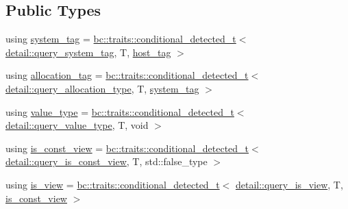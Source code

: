\subsection*{Public Types}
\begin{DoxyCompactItemize}
\item 
using \hyperlink{structbc_1_1tensors_1_1exprs_1_1expression__traits_a13a9bbc7ab291f35143c611ff93f69de}{system\+\_\+tag} = \hyperlink{namespacebc_1_1traits_a1a6d378947ec32acd457890854bcd592}{bc\+::traits\+::conditional\+\_\+detected\+\_\+t}$<$ \hyperlink{namespacebc_1_1tensors_1_1exprs_1_1detail_aa067b2ce78c8e7218f47bded8aec80a8}{detail\+::query\+\_\+system\+\_\+tag}, T, \hyperlink{structbc_1_1host__tag}{host\+\_\+tag} $>$
\item 
using \hyperlink{structbc_1_1tensors_1_1exprs_1_1expression__traits_ac3601870cb49bcd8048d3321b833a733}{allocation\+\_\+tag} = \hyperlink{namespacebc_1_1traits_a1a6d378947ec32acd457890854bcd592}{bc\+::traits\+::conditional\+\_\+detected\+\_\+t}$<$ \hyperlink{namespacebc_1_1tensors_1_1exprs_1_1detail_aa48f3a00816d9b230e5f0ce720323f57}{detail\+::query\+\_\+allocation\+\_\+type}, T, \hyperlink{structbc_1_1tensors_1_1exprs_1_1expression__traits_a13a9bbc7ab291f35143c611ff93f69de}{system\+\_\+tag} $>$
\item 
using \hyperlink{structbc_1_1tensors_1_1exprs_1_1expression__traits_ab4830d8c42c308632e269d6a8de49e83}{value\+\_\+type} = \hyperlink{namespacebc_1_1traits_a1a6d378947ec32acd457890854bcd592}{bc\+::traits\+::conditional\+\_\+detected\+\_\+t}$<$ \hyperlink{namespacebc_1_1tensors_1_1exprs_1_1detail_aa60e0a71bcf8048661b38b904c620fb0}{detail\+::query\+\_\+value\+\_\+type}, T, void $>$
\item 
using \hyperlink{structbc_1_1tensors_1_1exprs_1_1expression__traits_a9542c99877b734bea43fe8e42b3d3c04}{is\+\_\+const\+\_\+view} = \hyperlink{namespacebc_1_1traits_a1a6d378947ec32acd457890854bcd592}{bc\+::traits\+::conditional\+\_\+detected\+\_\+t}$<$ \hyperlink{namespacebc_1_1tensors_1_1exprs_1_1detail_a701fb55d84ce81a94fc5552092b64138}{detail\+::query\+\_\+is\+\_\+const\+\_\+view}, T, std\+::false\+\_\+type $>$
\item 
using \hyperlink{structbc_1_1tensors_1_1exprs_1_1expression__traits_ab6593beaa9f6774c56756001287176d9}{is\+\_\+view} = \hyperlink{namespacebc_1_1traits_a1a6d378947ec32acd457890854bcd592}{bc\+::traits\+::conditional\+\_\+detected\+\_\+t}$<$ \hyperlink{namespacebc_1_1tensors_1_1exprs_1_1detail_a6ed62ca06012f06dc8f6143998de1e9f}{detail\+::query\+\_\+is\+\_\+view}, T, \hyperlink{structbc_1_1tensors_1_1exprs_1_1expression__traits_a9542c99877b734bea43fe8e42b3d3c04}{is\+\_\+const\+\_\+view} $>$

\end{DoxyCompactItemize}

